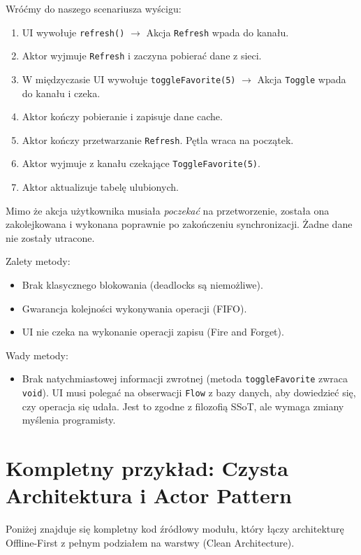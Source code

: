 Wróćmy do naszego scenariusza wyścigu:
\begin{enumerate}
    \item UI wywołuje \texttt{refresh()} $\rightarrow$ Akcja \texttt{Refresh} wpada do kanału.
    \item Aktor wyjmuje \texttt{Refresh} i zaczyna pobierać dane z sieci.
    \item W międzyczasie UI wywołuje \texttt{toggleFavorite(5)} $\rightarrow$ Akcja \texttt{Toggle} wpada do kanału i czeka.
    \item Aktor kończy pobieranie i zapisuje dane cache.
    \item Aktor kończy przetwarzanie \texttt{Refresh}. Pętla wraca na początek.
    \item Aktor wyjmuje z kanału czekające \texttt{ToggleFavorite(5)}.
    \item Aktor aktualizuje tabelę ulubionych.
\end{enumerate}

Mimo że akcja użytkownika musiała \textit{poczekać} na przetworzenie, została ona zakolejkowana i wykonana poprawnie po zakończeniu synchronizacji. Żadne dane nie zostały utracone.

Zalety metody:
\begin{itemize}
    \item Brak klasycznego blokowania (deadlocks są niemożliwe).
    \item Gwarancja kolejności wykonywania operacji (FIFO).
    \item  UI nie czeka na wykonanie operacji zapisu (Fire and Forget).
\end{itemize}

Wady metody:
\begin{itemize}
    \item Brak natychmiastowej informacji zwrotnej (metoda \texttt{toggleFavorite} zwraca \texttt{void}). UI musi polegać na obserwacji \texttt{Flow} z bazy danych, aby dowiedzieć się, czy operacja się udała. Jest to zgodne z filozofią SSoT, ale wymaga zmiany myślenia programisty.
\end{itemize}

\section{Kompletny przykład: Czysta Architektura i Actor Pattern}

Poniżej znajduje się kompletny kod źródłowy modułu, który łączy architekturę Offline-First z pełnym podziałem na warstwy (Clean Architecture). 

